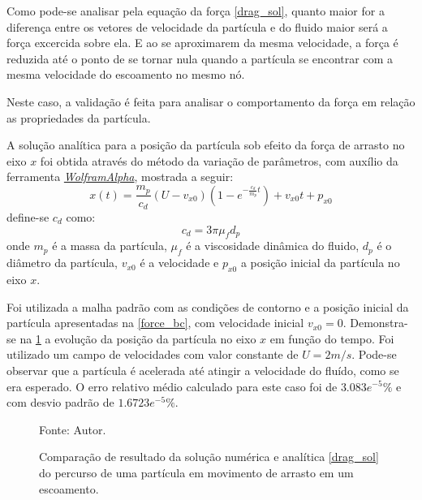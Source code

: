 Como pode-se analisar pela equação da força \eqref{drag_sol}, quanto maior for a diferença entre os vetores de velocidade da partícula e do fluido maior será a força excercida sobre ela.
E ao se aproximarem da mesma velocidade, a força é reduzida até o ponto de se tornar nula quando a partícula se encontrar com a mesma velocidade do escoamento no mesmo nó.

Neste caso, a validação é feita para analisar o comportamento da força em relação as propriedades da partícula.

A solução analítica para a posição da partícula sob efeito da força de arrasto no eixo $x$ foi obtida através do método da variação de parâmetros, com auxílio da ferramenta \href{https://www.wolframalpha.com}{\textit{WolframAlpha}}, mostrada a seguir:
\begin{equation}
    x(t) = \dfrac{m_p}{c_{d}} (U - v_{x0}) \left(1 - e^{-\frac{c_{d}}{m_p}t}\right) + v_{x0}t + p_{x0}
    \label{drag_sol} 
\end{equation}
define-se $c_{d}$ como:
\begin{equation}
    c_d = 3 \pi \mu_f d_p
    \label{drag_c} 
\end{equation}
onde $m_p$ é a massa da partícula, $\mu_f$ é a viscosidade dinâmica do fluido, $d_p$ é o diâmetro da partícula, $v_{x0}$ é a velocidade e $p_{x0}$ a posição inicial da partícula no eixo $x$.

Foi utilizada a malha padrão com as condições de contorno e a posição inicial da partícula apresentadas na \ref{force_bc}, com velocidade inicial $v_{x0}=0$.
Demonstra-se na \ref{drag_comp} a evolução da posição da partícula no eixo $x$ em função do tempo.
Foi utilizado um campo de velocidades com valor constante de $U=2m/s$.
Pode-se observar que a partícula é acelerada até atingir a velocidade do fluído, como se era esperado.
O erro relativo médio calculado para este caso foi de $3.083e^{-5}\%$ e com desvio padrão de $1.6723e^{-5}\%$.
\begin{figure}[H]
    \centering
     {\raggedleft \scriptsize Fonte: Autor.}
    \caption{Comparação de resultado da solução numérica e analítica \ref{drag_sol} do percurso de uma partícula em movimento de arrasto em um escoamento.}
    \label{drag_comp}
\end{figure}

